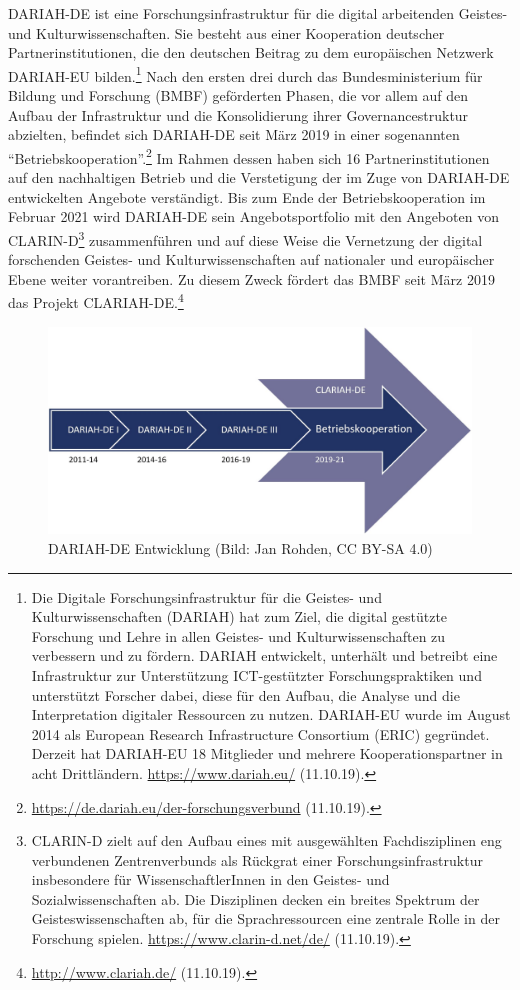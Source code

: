 \documentclass[a4paper,
fontsize=11pt,
oneside,
numbers=noperiodatend,
parskip=half-,
bibliography=totoc,
final
]{scrartcl}
\begin{document}
DARIAH-DE ist eine Forschungsinfrastruktur für die digital arbeitenden
Geistes- und Kulturwissenschaften. Sie besteht aus einer Kooperation
deutscher Partnerinstitutionen, die den deutschen Beitrag zu dem
europäischen Netzwerk DARIAH-EU bilden.\footnote{Die Digitale
  Forschungsinfrastruktur für die Geistes- und Kulturwissenschaften
  (DARIAH) hat zum Ziel, die digital gestützte Forschung und Lehre in
  allen Geistes- und Kulturwissenschaften zu verbessern und zu fördern.
  DARIAH entwickelt, unterhält und betreibt eine Infrastruktur zur
  Unterstützung ICT-gestützter Forschungspraktiken und unterstützt
  Forscher dabei, diese für den Aufbau, die Analyse und die
  Interpretation digitaler Ressourcen zu nutzen. DARIAH-EU wurde im
  August 2014 als European Research Infrastructure Consortium (ERIC)
  gegründet. Derzeit hat DARIAH-EU 18 Mitglieder und mehrere
  Kooperationspartner in acht Drittländern. \url{https://www.dariah.eu/}
  (11.10.19).} Nach den ersten drei durch das Bundesministerium für
Bildung und Forschung (BMBF) geförderten Phasen, die vor allem auf den
Aufbau der Infrastruktur und die Konsolidierung ihrer Governancestruktur
abzielten, befindet sich DARIAH-DE seit März 2019 in einer sogenannten
\enquote{Betriebskooperation}.\footnote{\url{https://de.dariah.eu/der-forschungsverbund}
  (11.10.19).} Im Rahmen dessen haben sich 16 Partnerinstitutionen auf
den nachhaltigen Betrieb und die Verstetigung der im Zuge von DARIAH-DE
entwickelten Angebote verständigt. Bis zum Ende der Betriebskooperation
im Februar 2021 wird DARIAH-DE sein Angebotsportfolio mit den Angeboten
von CLARIN-D\footnote{CLARIN-D zielt auf den Aufbau eines mit
  ausgewählten Fachdisziplinen eng verbundenen Zentrenverbunds als
  Rückgrat einer Forschungsinfrastruktur insbesondere für
  WissenschaftlerInnen in den Geistes- und Sozialwissenschaften ab. Die
  Disziplinen decken ein breites Spektrum der Geisteswissenschaften ab,
  für die Sprachressourcen eine zentrale Rolle in der Forschung spielen.
  \url{https://www.clarin-d.net/de/} (11.10.19).} zusammenführen und auf
diese Weise die Vernetzung der digital forschenden Geistes- und
Kulturwissenschaften auf nationaler und europäischer Ebene weiter
vorantreiben. Zu diesem Zweck fördert das BMBF seit März 2019 das
Projekt CLARIAH-DE.\footnote{\url{http://www.clariah.de/} (11.10.19).}

\begin{figure}
\centering
\includegraphics{img/DARIAHEntwicklung.jpg}
\caption{DARIAH-DE Entwicklung (Bild: Jan Rohden, CC BY-SA 4.0)}
\end{figure}
\end{document}
